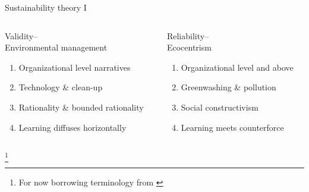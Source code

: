 \begin{frame}{Sustainability theory I}
	\begin{columns}[t]
		\begin{column}{0.45\textwidth}
			\begin{block}{Validity--\\Environmental management}
				\begin{enumerate}
					\item <1-> Organizational level narratives
					\item <2-> Technology \& clean-up
					\emptyline
					\item <3-> Rationality \& bounded rationality
					\item <4-> Learning diffuses horizontally
				\end{enumerate}
			\end{block}
		\end{column}
		\vline
		\hspace{2pt}
		\begin{column}{0.45\textwidth}
			\begin{block}{Reliability--\\Ecocentrism}
				\begin{enumerate}
					\item <1-> Organizational level and above
					\item <2-> Greenwashing \& pollution
					\item <3-> Social constructivism
					\emptyline
					\item <4-> Learning meets counterforce
				\end{enumerate}
			\end{block}
		\end{column}
	\end{columns}

	\hrulefill

	{\footnote{For now borrowing terminology from \citet{Purser1995}}}

	\emptyline

\end{frame}

\blackgroup
\begin{frame}[plain]
\end{frame}
\egroup